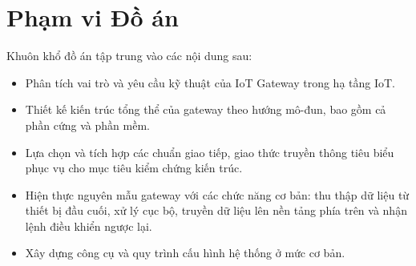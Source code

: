 \section{Phạm vi Đồ án}
    Khuôn khổ đồ án tập trung vào các nội dung sau:
    \begin{itemize}
        \item Phân tích vai trò và yêu cầu kỹ thuật của IoT Gateway trong hạ tầng IoT.
        \item Thiết kế kiến trúc tổng thể của gateway theo hướng mô-đun, bao gồm cả phần cứng và phần mềm.
        \item Lựa chọn và tích hợp các chuẩn giao tiếp, giao thức truyền thông tiêu biểu phục vụ cho mục tiêu kiểm chứng kiến trúc.
        \item Hiện thực nguyên mẫu gateway với các chức năng cơ bản: thu thập dữ liệu từ thiết bị đầu cuối, xử lý cục bộ, truyền dữ liệu lên nền tảng phía trên và nhận lệnh điều khiển ngược lại.
        \item Xây dựng công cụ và quy trình cấu hình hệ thống ở mức cơ bản.
    \end{itemize}